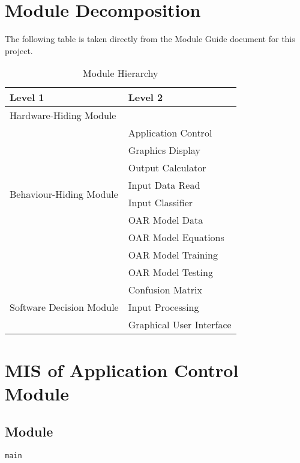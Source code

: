 \documentclass[12pt, titlepage]{article}
\def\code#1{\texttt{#1}}
\begin{document}
\section{Module Decomposition}

The following table is taken directly from the Module Guide document for this project.

\begin{table}[h!]
  \centering
  \begin{tabular}{p{} p{}}
  \toprule
  \textbf{Level 1} & \textbf{Level 2}\\
  \midrule
    
  {Hardware-Hiding Module} & ~\\
  \midrule
    
  \multirow{8}{0.3\textwidth}{Behaviour-Hiding Module}
    & Application Control \\
    & Graphics Display \\
    & Output Calculator \\
    & Input Data Read \\
    & Input Classifier \\
    & OAR Model Data \\
    & OAR Model Equations \\
    & OAR Model Training\\
    & OAR Model Testing\\
    \midrule
    
    \multirow{3}{0.3\textwidth}{Software Decision Module}
      & Confusion Matrix\\
      & Input Processing\\
      & Graphical User Interface \\
    \bottomrule
    
    \end{tabular}
  \caption{Module Hierarchy}
  \label{TblMH}
  \end{table}
  
\newpage

\section{MIS of Application Control Module} \label{ModuleAC} 

\subsection{Module}

\code{main} 
\end{document}
